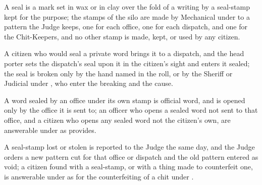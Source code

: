 \begin{clauses}
\item A seal is a mark set in wax or in clay over the fold of a writing by a seal-stamp kept for the purpose; the stamps of the silo are made by Mechanical under  to a pattern the Judge keeps, one for each office, one for each dispatch, and one for the Chit-Keepers, and no other stamp is made, kept, or used by any citizen.
\item A citizen who would seal a private word brings it to a dispatch, and the head porter sets the dispatch's seal upon it in the citizen's sight and enters it sealed; the seal is broken only by the hand named in the roll, or by the Sheriff or Judicial under , who enter the breaking and the cause.
\item A word sealed by an office under its own stamp is official word, and is opened only by the office it is sent to; an officer who opens a sealed word not sent to that office, and a citizen who opens any sealed word not the citizen's own, are answerable under  as  provides.
\item A seal-stamp lost or stolen is reported to the Judge the same day, and the Judge orders a new pattern cut for that office or dispatch and the old pattern entered as void; a citizen found with a seal-stamp, or with a thing made to counterfeit one, is answerable under  as for the counterfeiting of a chit under .
\end{clauses}
